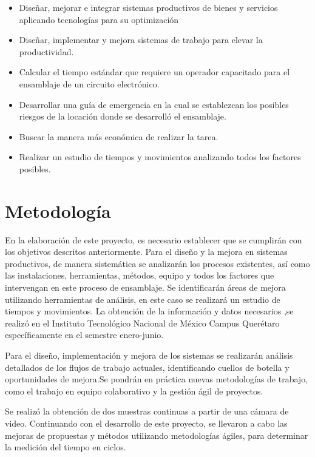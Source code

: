 \begin{itemize}
    \begin{itemize}
        \item Diseñar, mejorar e integrar sistemas productivos de bienes y servicios aplicando tecnologías para su optimización
        \item Diseñar, implementar y mejora sistemas de trabajo para elevar la productividad.
        \item Calcular el tiempo estándar que requiere un operador capacitado para el ensamblaje de un circuito electrónico.
        \item Desarrollar una guía de emergencia en la cual se establezcan los posibles riesgos de la locación donde se desarrolló el ensamblaje.
        \item Buscar la manera más económica de realizar la tarea.
        \item Realizar un estudio de tiempos y movimientos analizando todos los factores posibles.
    \end{itemize}
    
    
    \section{Metodología}
    
    
    
    En la elaboración de este proyecto, es necesario establecer que se cumplirán con los objetivos descritos anteriormente. Para el diseño y la mejora en sistemas productivos, de manera sistemática se analizarán los procesos existentes, así como las instalaciones, herramientas, métodos, equipo y todos los factores que intervengan en este proceso de ensamblaje. Se identificarán áreas de mejora utilizando herramientas de análisis, en este caso se realizará un estudio de tiempos y movimientos. La obtención de la información y datos necesarios ,se realizó en el Instituto Tecnológico Nacional de México Campus Querétaro específicamente en el semestre enero-junio.
    
   Para el diseño, implementación y mejora de los sistemas se realizarán análisis detallados de los flujos de trabajo actuales, identificando cuellos de botella y oportunidades de mejora.Se pondrán en práctica nuevas metodologías de trabajo, como el trabajo en equipo colaborativo y la gestión ágil de proyectos.
   
    Se realizó la obtención de dos muestras continuas a partir de una cámara de video.  Continuando con el desarrollo de este proyecto, se llevaron a cabo las mejoras de propuestas y métodos utilizando metodologías ágiles, para determinar la medición del tiempo en ciclos.
    

\end{itemize}

